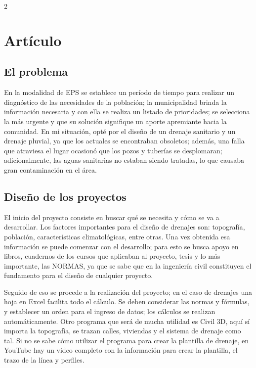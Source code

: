\documentclass[12pt,spanish,Letterpaper,openany]{book}
\begin{document}
\begin {multicols}{2}
{\section{Artículo}\label{artuxedculo-1}}

\hypertarget{el-problema}{%
\subsection{El problema}\label{el-problema}}

En la modalidad de EPS se establece un período de tiempo para realizar un diagnóstico de las necesidades de la población; la municipalidad brinda la información necesaria y con ella se realiza un listado de prioridades; se selecciona la más urgente y que su solución signifique un aporte apremiante hacia la comunidad. En mi situación, opté por el diseño de un drenaje sanitario y un drenaje pluvial, ya que los actuales se encontraban obsoletos; además, una falla que atraviesa el lugar ocasionó que los pozos y tuberías se desplomaran; adicionalmente, las aguas sanitarias no estaban siendo tratadas, lo que causaba gran contaminación en el área.

\hypertarget{diseuxf1o-de-los-proyectos}{%
\subsection{Diseño de los proyectos}\label{diseuxf1o-de-los-proyectos}}

El inicio del proyecto consiste en buscar qué se necesita y cómo se va a desarrollar. Los factores importantes para el diseño de drenajes son: topografía, población, características climatológicas, entre otras. Una vez obtenida esa información se puede comenzar con el desarrollo; para esto se busca apoyo en libros, cuadernos de los cursos que aplicaban al proyecto, tesis y lo más importante, las NORMAS, ya que se sabe que en la ingeniería civil constituyen el fundamento para el diseño de cualquier proyecto.

Seguido de eso se procede a la realización del proyecto; en el caso de drenajes una hoja en Excel facilita todo el cálculo. Se deben considerar las normas y fórmulas, y establecer un orden para el ingreso de datos; los cálculos se realizan automáticamente. Otro programa que será de mucha utilidad es Civil 3D, aquí sí importa la topografía, se trazan calles, viviendas y el sistema de drenaje como tal. Si no se sabe cómo utilizar el programa para crear la plantilla de drenaje, en YouTube hay un video completo con la información para crear la plantilla, el trazo de la línea y perfiles.


\end{multicols}
\end{document}

